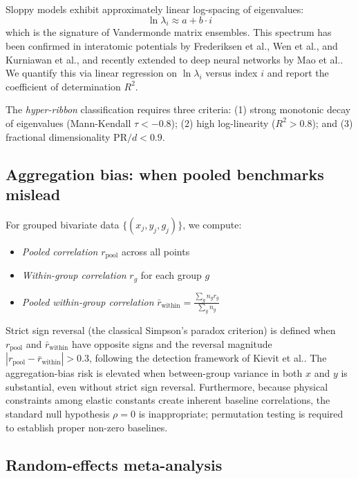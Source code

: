 \documentclass[twocolumn,10pt]{article}
\begin{document}
Sloppy models exhibit approximately linear log-spacing of eigenvalues:
\begin{equation}
\ln \lambda_i \approx a + b \cdot i
\end{equation}
which is the signature of Vandermonde matrix ensembles\cite{waterfall2006}. This spectrum has been confirmed in interatomic potentials by Frederiksen et al.\cite{frederiksen2004}, Wen et al.\cite{wen2017}, and Kurniawan et al.\cite{kurniawan2022}, and recently extended to deep neural networks by Mao et al.\cite{mao2024,mao2026}. We quantify this via linear regression on $\ln \lambda_i$ versus index $i$ and report the coefficient of determination $R^2$.

The \textit{hyper-ribbon} classification requires three criteria: (1) strong monotonic decay of eigenvalues (Mann-Kendall $\tau < -0.8$); (2) high log-linearity ($R^2 > 0.8$); and (3) fractional dimensionality $\text{PR}/d < 0.9$.

\subsection{Aggregation bias: when pooled benchmarks mislead}

For grouped bivariate data $\{(x_j, y_j, g_j)\}$, we compute:
\begin{itemize}
\item \textit{Pooled correlation} $r_\text{pool}$ across all points
\item \textit{Within-group correlation} $r_g$ for each group $g$
\item \textit{Pooled within-group correlation} $\bar{r}_\text{within} = \frac{\sum_g n_g r_g}{\sum_g n_g}$
\end{itemize}

Strict sign reversal (the classical Simpson's paradox criterion) is defined when $r_\text{pool}$ and $\bar{r}_\text{within}$ have opposite signs and the reversal magnitude $|r_\text{pool} - \bar{r}_\text{within}| > 0.3$, following the detection framework of Kievit et al.\cite{kievit2013}. The aggregation-bias risk is elevated when between-group variance in both $x$ and $y$ is substantial, even without strict sign reversal. Furthermore, because physical constraints among elastic constants create inherent baseline correlations, the standard null hypothesis $\rho = 0$ is inappropriate\cite{jackson1991,archie1981}; permutation testing is required to establish proper non-zero baselines.

\subsection{Random-effects meta-analysis}
\end{document}
